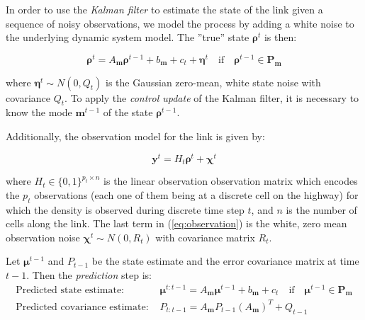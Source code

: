 \documentclass[11pt]{article}
\numberwithin{equation}{section}
\numberwithin{figure}{section}
\numberwithin{table}{section}
\begin{document}
In order to use the \textit{Kalman filter} to estimate the state of the link given a sequence of noisy observations, we model the process by adding a white noise to the underlying dynamic system model. The ''true'' state $\boldsymbol\rho^{t}$ is then:

\begin{equation}
\boldsymbol\rho^{t} = A_{\boldsymbol m} \boldsymbol\rho^{t-1} + b_{\boldsymbol m} + c_{t} + \boldsymbol\eta^{t} \quad\text{if}\quad\boldsymbol\rho^{t-1}\in\textbf{P}_{\boldsymbol m}
\label{eq:underlyingSystemDN3}
\end{equation}

\noindent where $\boldsymbol\eta^{t}\sim N(0,Q_{t})$ is the Gaussian zero-mean, white state noise with covariance $Q_{t}$. To apply the \textit{control update} of the Kalman filter, it is necessary to know the mode $\boldsymbol m^{t-1}$ of the state $\boldsymbol\rho^{t-1}$.

Additionally, the observation model for the link is given by:

\begin{equation}
\boldsymbol y^{t} = H_{t}\boldsymbol\rho^{t} + \boldsymbol\chi^{t}
\label{eq:observation}
\end{equation}

\noindent where $H_{t}\in \{ 0,1 \}^{p_{t}\times n}$ is the linear observation observation matrix which encodes the $p_{t}$ observations (each one of them being at a discrete cell on the highway) for which the density is observed during discrete time step $t$, and $n$ is the number of cells along the link. The last term in (\ref{eq:observation}) is the white, zero mean observation noise $\boldsymbol\chi^{t} \sim N(0,R_{t})$ with covariance matrix $R_{t}$.

\noindent Let $\boldsymbol\mu^{t-1}$ and $P_{t-1}$ be the state estimate and the error covariance matrix at time $t-1$. Then the \textit{prediction} step is:
\begin{equation}
\begin{array}{ll}
\text{Predicted state estimate: } & \boldsymbol\mu^{t:t-1} = A_{\boldsymbol m} \boldsymbol\mu^{t-1} + b_{\boldsymbol m} + c_{t}
\quad\text{if}\quad\boldsymbol\mu^{t-1}\in\textbf{P}_{\boldsymbol m}\\
\text{Predicted covariance estimate: } & P_{t:t-1} = A_{\boldsymbol m}P_{t-1}(A_{\boldsymbol m})^{T} + Q_{t-1}
\end{array}
\label{eq:predict}
\end{equation}
\end{document}
